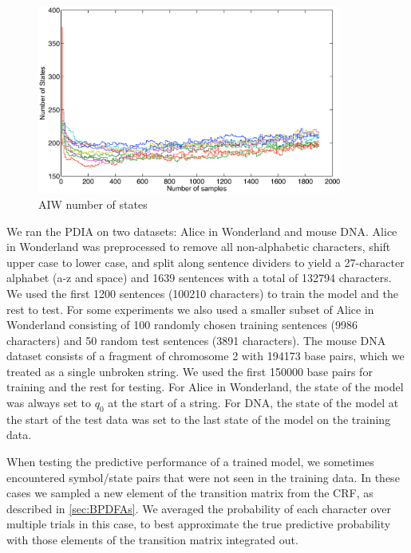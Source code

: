 \begin{figure}[htbp]
\begin{center}
\includegraphics[width=10cm]{results/aiw_small_numstates}
\caption{AIW number of states}
\label{fig:aiw_small_numstates}
\end{center}
\end{figure}

We ran the PDIA on two datasets: Alice in Wonderland and mouse DNA.  Alice in Wonderland was preprocessed to remove all non-alphabetic characters, shift upper case to lower case, and split along sentence dividers to yield a 27-character alphabet (a-z and space) and 1639 sentences with a total of 132794 characters.  We used the first 1200 sentences (100210 characters) to train the model and the rest to test.  For some experiments we also used a smaller subset of Alice in Wonderland consisting of 100 randomly chosen training sentences (9986 characters) and 50 random test sentences (3891 characters).  The mouse DNA dataset consists of a fragment of chromosome 2 with 194173 base pairs, which we treated as a single unbroken string.  We used the first 150000 base pairs for training and the rest for testing.  For Alice in Wonderland, the state of the model was always set to $q_0$ at the start of a string.  For DNA, the state of the model at the start of the test data was set to the last state of the model on the training data.

When testing the predictive performance of a trained model, we sometimes encountered symbol/state pairs that were not seen in the training data.  In these cases we sampled a new element of the transition matrix from the CRF, as described in \ref{sec:BPDFAs}.  We averaged the probability of each character over multiple trials in this case, to best approximate the true predictive probability with those elements of the transition matrix integrated out.